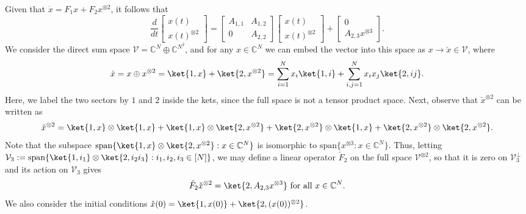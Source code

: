 \documentclass[superscriptaddress,onecolumn,nofootinbib,longbibliography,a4paper,accepted=2026-09-29]{quantumarticle}
\theoremstyle{plain}
\theoremstyle{definition}
\numberwithin{thm}{section}
\numberwithin{assumption}{section}
\numberwithin{lemma}{section}
\numberwithin{prop}{section}
\numberwithin{cor}{section}
\numberwithin{definition}{section}
\numberwithin{rmk}{section}
\numberwithin{equation}{section}
\begin{document}
Given that $\dot{x} = F_1 x + F_2 x^{\otimes 2}$, it follows that
\begin{equation}\label{eq:2nd-level-Carleman}
    \frac{d}{dt} \begin{bmatrix} x(t) \\ x(t)^{\otimes 2}\end{bmatrix} = \begin{bmatrix}
        A_{1,1} & A_{1,2} \\ 0 & A_{2,2}
    \end{bmatrix} \begin{bmatrix} x(t) \\ x(t)^{\otimes 2}\end{bmatrix} + \begin{bmatrix} 0 \\  A_{2,3} x^{\otimes 3} \end{bmatrix}.
\end{equation}
We consider the direct sum space $\mathcal{V}=\mathbb{C}^N \oplus \mathbb{C}^{N^2}$, and for any $x \in \mathbb{C}^N$ we can embed the vector into this space as $x \rightarrow \check{x} \in \mathcal{V}$, where
\begin{equation}
    \check{x} = x \oplus x^{\otimes 2} = \ket{1,x } + \ket{2,x^{\otimes 2}} = \sum_{i=1}^N x_i \ket{1,i} + \sum_{i,j=1}^N x_i x_j \ket{2,ij}.
\end{equation} 
Here, we label the two sectors by $1$ and $2$ inside the kets, since the full space is not a tensor product space. Next, observe that $\check{x}^{\otimes 2}$ can be written as
\begin{equation}
    \check{x}^{\otimes 2} = \ket{1,x }\otimes \ket{1,x } + \ket{1,x }\otimes \ket{2,x^{\otimes 2}} + \ket{2,x^{\otimes 2}}\otimes \ket{1,x} + \ket{2,x^{\otimes 2}}\otimes \ket{2,x^{\otimes 2}}.
\end{equation}
Note that the subspace $\mbox{span} \{\ket{1,x }\otimes \ket{2,x^{\otimes 2}} : x \in \mathbb{C}^N \} $ is isomorphic to $\mbox{span} \{x^{\otimes 3} : x \in \mathbb{C}^N\}$. Thus, letting $\mathcal{V}_3:=\mbox{span} \{\ket{1,i_1 }\otimes \ket{2,i_2i_3} : i_1,i_2,i_3 \in [N] \}$, we may define a linear operator $\check{F}_2$ on the full space $\mathcal{V}^{\otimes 2}$, so that it is zero on $\mathcal{V}_3^\perp$ and its action on $\mathcal{V}_3$ gives
\begin{equation}
    \check{F}_2  \check{x}^{\otimes 2} = \ket{2, A_{2,3} x^{\otimes 3}} \mbox{ for all } x \in \mathbb{C}^N.
\end{equation}
We also consider the initial conditions $\check{x}(0) = \ket{1,x(0)} + \ket{2,(x(0))^{\otimes 2}}$.
\end{document}
